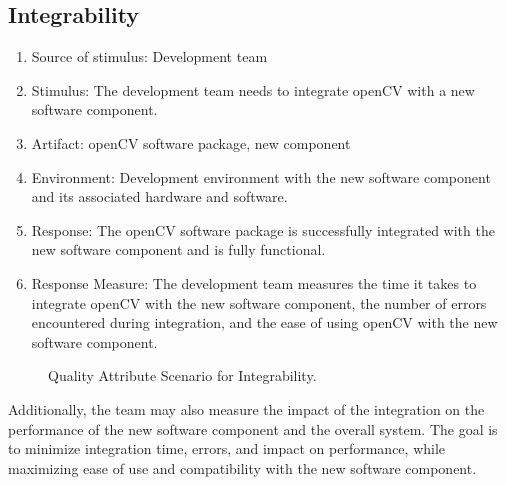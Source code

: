 \subsection{Integrability\label{subSection::IntegrabilityQA}}
\begin{enumerate}
    \item Source of stimulus: Development team
    \item Stimulus: The development team needs to integrate openCV with a new software component.
    \item Artifact: openCV software package, new component
    \item Environment: Development environment with the new software component and its associated hardware and software.
    \item Response: The openCV software package is successfully integrated with the new software component and is fully functional.
    \item Response Measure: The development team measures the time it takes to integrate openCV with the new software component, the number of errors encountered during integration, and the ease of using openCV with the new software component.
\end{enumerate}
\begin{figure}[H]
\centering
{}
\caption{\label{Figure::Quality Attribute Scenario for Integrability} Quality Attribute Scenario for Integrability.}
\end{figure}
Additionally, the team may also measure the impact of the integration on the performance of the new software component and the overall system. The goal is to minimize integration time, errors, and impact on performance, while maximizing ease of use and compatibility with the new software component.
